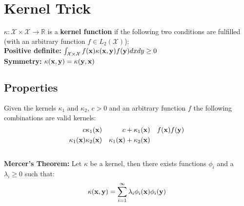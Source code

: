 \section{Kernel Trick}
\begin{mdframed}[style=eqbox]
$\kappa: \mathcal X \times \mathcal X \rightarrow \mathbb R$ is a \textbf{kernel function} if the following two conditions are fulfilled (with an arbitrary function $f \in L_2(\mathcal X)$):\\
\textbf{Positive definite:} $\int_{ \mathcal X \times \mathcal X} f(\mathbf{x}) \kappa(\mathbf{x}, \mathbf{y}) f( \mathbf{y}) dx dy \geq 0$\\
\textbf{Symmetry:}  $ \kappa(\mathbf{x}, \mathbf{y}) = \kappa(\mathbf{y}, \mathbf{x})$
\end{mdframed}
%
%
\begin{mdframed}[style=eqbox]
\subsection{Properties}
Given the kernels $\kappa_1$ and $\kappa_2$, $c > 0$ and an arbitrary function $f$ the following combinations are valid kernels:
\vspace*{-8pt}\begin{align*}
  c \kappa_1(\mathbf{x}) && c + \kappa_1(\mathbf{x}) && f(\mathbf{x}) f(\mathbf{y})\\
  \kappa_1(\mathbf{x}) \kappa_2(\mathbf{x}) && \kappa_1(\mathbf{x}) + \kappa_2(\mathbf{x})
\end{align*}\vspace*{-16pt}\\
\textbf{Mercer's Theorem:}
Let $\kappa$ be a kernel, then there exists functions $\phi_i$ and a $\lambda_i \geq 0$ such that:
\vspace*{-8pt}\begin{align*}
\kappa(\mathbf{x}, \mathbf{y}) = \sum_{i=1}^{\infty} \lambda_i \phi_i(\mathbf{x}) \phi_i(\mathbf{y})
\end{align*}
\end{mdframed}